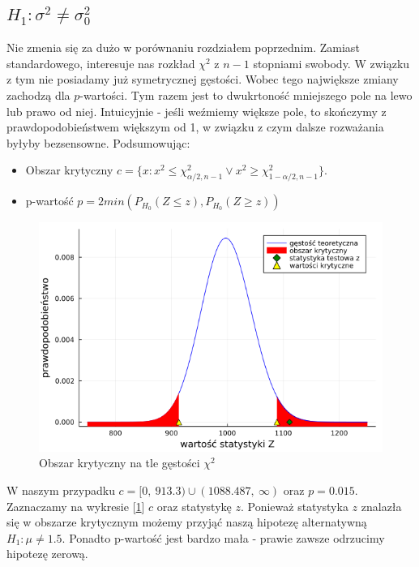 \documentclass{article}
\theoremstyle{break}
\begin{document}
\newpage

\subsection{$H_1: \sigma^2 \ne \sigma^2_0$}

Nie zmenia się za dużo w porównaniu rozdziałem poprzednim. Zamiast standardowego, interesuje nas rozkład $\chi^2$ z $n-1$ stopniami swobody. W związku z tym nie posiadamy już
symetrycznej gęstości. Wobec tego największe zmiany zachodzą dla $p$-wartości. Tym razem jest to dwukrtoność mniejszego pole na lewo lub prawo od niej. Intuicyjnie - jeśli weźmiemy większe pole, to skończymy z prawdopodobieństwem większym od 1, w związku z czym dalsze rozważania byłyby bezsensowne. Podsumowując:

\begin{itemize}
	\item Obszar krytyczny $c=\{x: x^2\leq \chi^2_{\alpha/2,n-1} \lor x^2\geq \chi^2_{1-\alpha/2,n-1}\}$.
	\item p-wartość $p=2min(P_{H_0}(Z\leq z),P_{H_0}(Z\geq z))$
\end{itemize}
\begin{figure}[H]
	\begin{center}
		\includegraphics[scale=0.5]{Z2.1.png}
		\caption{Obszar krytyczny na tle gęstości $\chi^2$}
		\label{fig:4}
	\end{center}
\end{figure}
W naszym przypadku $c=[0,~913.3)\cup (1088.487,~\infty)$ oraz $p=0.015$.\\
Zaznaczamy na wykresie [\ref{fig:4}]  $c$ oraz statystykę $z$. Ponieważ statystyka $z$ znalazła się w obszarze krytycznym możemy przyjąć naszą hipotezę alternatywną $H_1: \mu \ne 1.5$. Ponadto p-wartość jest bardzo mała - prawie zawsze odrzucimy hipotezę zerową.
\newpage
\end{document}
